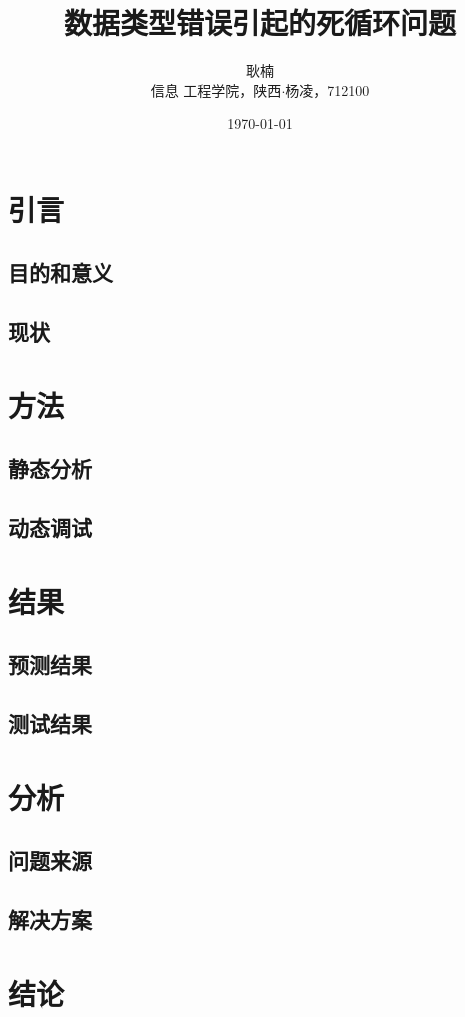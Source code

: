\documentclass{nwafucoursepaper}
\title{\bfseries\sffamily 数据类型错误引起的死循环问题}
\author{\zihao{4} \fangsong 耿楠\\\small \songti 信息
  工程学院，陕西$\cdot$杨凌，712100}
\date{\today}
\begin{document}
\maketitle
\thispagestyle{empty}
\makeabstract

\section{引言}
\subsection{目的和意义}
\zhlipsum[2]
\subsection{现状}
\zhlipsum[3]
\section{方法}
\subsection{静态分析}
\zhlipsum[4]
\subsection{动态调试}
\zhlipsum[5]
\section{结果}
\subsection{预测结果}
\zhlipsum[6]
\subsection{测试结果}
\zhlipsum[7]
\section{分析}
\subsection{问题来源}
\zhlipsum[8]
\subsection{解决方案}
\zhlipsum[9]
\section{结论}
\zhlipsum[10]
\end{document}

